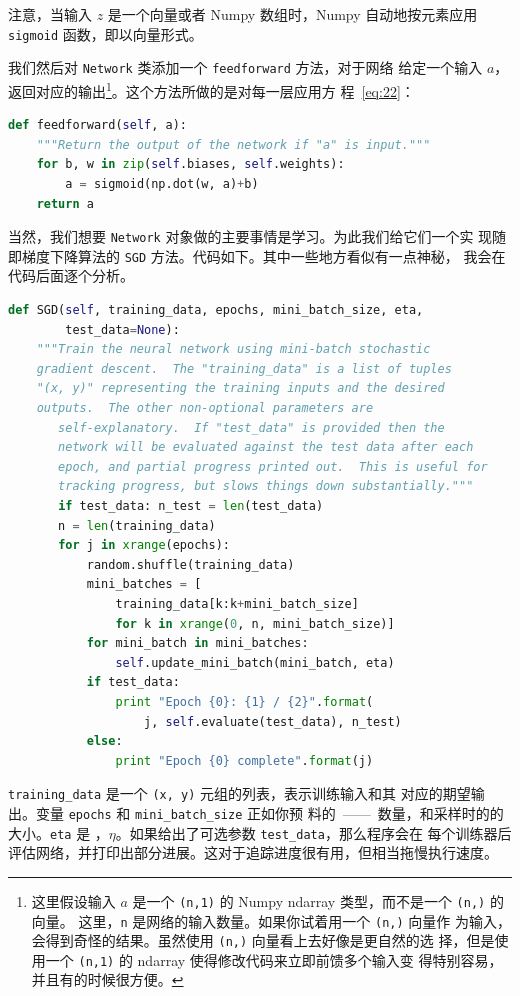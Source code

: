 注意，当输入 $z$ 是一个向量或者 Numpy 数组时，Numpy 自动地按元素应用
\lstinline!sigmoid! 函数，即以向量形式。

我们然后对 \lstinline!Network! 类添加一个 \lstinline!feedforward! 方法，对于网络
给定一个输入 $a$，返回对应的输出\footnote{这里假设输入 $a$ 是一个
  \lstinline!(n,1)! 的 Numpy ndarray 类型，而不是一个 \lstinline!(n,)! 的向量。
  这里，\lstinline!n! 是网络的输入数量。如果你试着用一个 \lstinline!(n,)! 向量作
  为输入，会得到奇怪的结果。虽然使用 \lstinline!(n,)! 向量看上去好像是更自然的选
  择，但是使用一个 \lstinline!(n,1)! 的 ndarray 使得修改代码来立即前馈多个输入变
  得特别容易，并且有的时候很方便。}。这个方法所做的是对每一层应用方
程~\eqref{eq:22}：
\begin{lstlisting}[language=Python]
def feedforward(self, a):
    """Return the output of the network if "a" is input."""
    for b, w in zip(self.biases, self.weights):
        a = sigmoid(np.dot(w, a)+b)
    return a
\end{lstlisting}

当然，我们想要 \lstinline!Network! 对象做的主要事情是学习。为此我们给它们一个实
现随即梯度下降算法的 \lstinline!SGD! 方法。代码如下。其中一些地方看似有一点神秘，
我会在代码后面逐个分析。
\begin{lstlisting}[language=Python]
def SGD(self, training_data, epochs, mini_batch_size, eta,
        test_data=None):
    """Train the neural network using mini-batch stochastic
    gradient descent.  The "training_data" is a list of tuples
    "(x, y)" representing the training inputs and the desired
    outputs.  The other non-optional parameters are
       self-explanatory.  If "test_data" is provided then the
       network will be evaluated against the test data after each
       epoch, and partial progress printed out.  This is useful for
       tracking progress, but slows things down substantially."""
       if test_data: n_test = len(test_data)
       n = len(training_data)
       for j in xrange(epochs):
           random.shuffle(training_data)
           mini_batches = [
               training_data[k:k+mini_batch_size]
               for k in xrange(0, n, mini_batch_size)]
           for mini_batch in mini_batches:
               self.update_mini_batch(mini_batch, eta)
           if test_data:
               print "Epoch {0}: {1} / {2}".format(
                   j, self.evaluate(test_data), n_test)
           else:
               print "Epoch {0} complete".format(j)
\end{lstlisting}

\lstinline!training_data! 是一个 \lstinline!(x, y)! 元组的列表，表示训练输入和其
对应的期望输出。变量 \lstinline!epochs! 和 \lstinline!mini_batch_size! 正如你预
料的~——~\epochs{}数量，和采样时的\minibatch{}的大小。\lstinline!eta! 是%
\learningrate{}，$\eta$。如果给出了可选参数 \lstinline!test_data!，那么程序会在
每个训练器后评估网络，并打印出部分进展。这对于追踪进度很有用，但相当拖慢执行速度。

